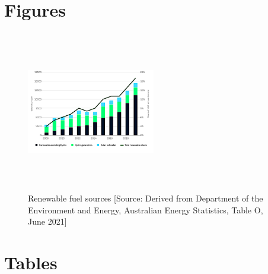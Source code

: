 \documentclass[mstat,12pt]{unswthesis}
\begin{document}
\hypertarget{figures}{%
\section*{\texorpdfstring{\textbf{Figures}}{Figures}}\label{figures}}

\begin{figure}[H]
\centering
\includegraphics[width=0.5\textwidth,height=7cm]{renewable_fuel_sources_chart.png}
\caption{Renewable fuel sources [Source:
Derived from Department of the Environment and Energy, Australian Energy Statistics, Table O, June 2021]}\label{renewable}
\end{figure}

\hypertarget{tables}{%
\section*{\texorpdfstring{\textbf{Tables}}{Tables}}\label{tables}}
\end{document}
